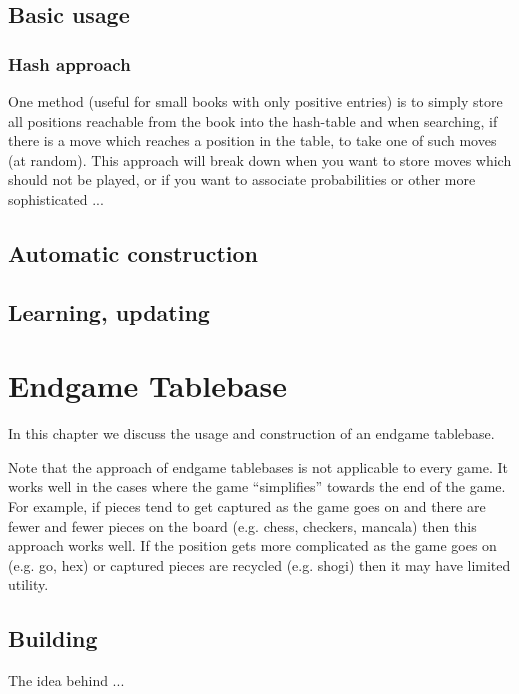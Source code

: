 \documentclass[10pt,dvipdfmx,letterpaper]{report}
\begin{document}
\section{Basic usage}

\subsection{Hash approach}
One method (useful for small books with only positive entries)
is to simply store all positions
reachable from the book into the hash-table and when searching, if there
is a move which reaches a position in the table, to take one of such moves
(at random).  This approach will break down when you want to store moves
which should not be played, or if you want to associate probabilities or
other more sophisticated ...

\section{Automatic construction}

\section{Learning, updating}

\chapter{Endgame Tablebase}
\label{chap-endgame}

In this chapter we discuss the usage and construction of an endgame tablebase.

Note that the approach of endgame tablebases is not applicable to every game.  It works well
in the cases where the game ``simplifies'' towards the end of the game.  For example, if pieces
tend to get captured as the game goes on and there are fewer and fewer pieces on the board
(e.g. chess, checkers, mancala) then this approach works well.  If the position gets more complicated
as the game goes on (e.g. go, hex) or captured pieces are recycled (e.g. shogi)
then it may have limited utility.

\section{Building}
The idea behind ...
\end{document}
